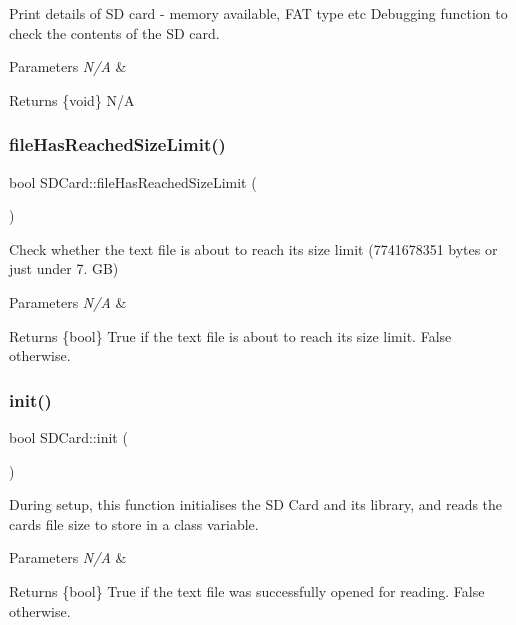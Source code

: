 Print details of SD card -\/ memory available, F\+AT type etc Debugging function to check the contents of the SD card. 
\begin{DoxyParams}{Parameters}
{\em N/A} & \\
\hline
\end{DoxyParams}
\begin{DoxyReturn}{Returns}
\{void\} N/A 
\end{DoxyReturn}
\mbox{\label{class_s_d_card_ab43bfe585365622d71e30194a404125c}} 
\subsubsection{\texorpdfstring{file\+Has\+Reached\+Size\+Limit()}{fileHasReachedSizeLimit()}}
{\footnotesize\ttfamily bool S\+D\+Card\+::file\+Has\+Reached\+Size\+Limit (\begin{DoxyParamCaption}{ }\end{DoxyParamCaption})}

Check whether the text file is about to reach its size limit (7741678351 bytes or just under 7. GB) 
\begin{DoxyParams}{Parameters}
{\em N/A} & \\
\hline
\end{DoxyParams}
\begin{DoxyReturn}{Returns}
\{bool\} True if the text file is about to reach its size limit. False otherwise. 
\end{DoxyReturn}
\mbox{\label{class_s_d_card_a7d5b2551a395d7bf883f425fb98b0b0d}} 
\subsubsection{\texorpdfstring{init()}{init()}}
{\footnotesize\ttfamily bool S\+D\+Card\+::init (\begin{DoxyParamCaption}{ }\end{DoxyParamCaption})}

During setup, this function initialises the SD Card and its library, and reads the card\textquotesingle{}s file size to store in a class variable. 
\begin{DoxyParams}{Parameters}
{\em N/A} & \\
\hline
\end{DoxyParams}
\begin{DoxyReturn}{Returns}
\{bool\} True if the text file was successfully opened for reading. False otherwise. 
\end{DoxyReturn}
\mbox{\label{class_s_d_card_a9c0edb3dd7e157501776d9760705a757}} 
